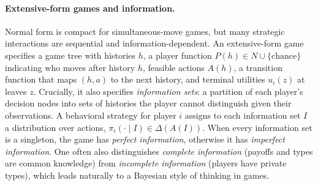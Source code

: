 \documentclass{article}
\begin{document}
\paragraph{Extensive-form games and information.}
Normal form is compact for simultaneous-move games, but many strategic interactions are sequential and information-dependent. An extensive-form game specifies a game tree with histories \(h\), a player function \(P(h)\in N\cup\{\text{chance}\}\) indicating who moves after history \(h\), feasible actions \(A(h)\), a transition function that maps \((h,a)\) to the next history, and terminal utilities \(u_i(z)\) at leaves \(z\). Crucially, it also specifies \emph{information sets}: a partition of each player’s decision nodes into sets of histories the player cannot distinguish given their observations. A behavioral strategy for player \(i\) assigns to each information set \(I\) a distribution over actions, \(\pi_i(\cdot \mid I)\in \Delta(A(I))\). When every information set is a singleton, the game has \emph{perfect information}, otherwise it has \emph{imperfect information}. One often also distinguishes \emph{complete information} (payoffs and types are common knowledge) from \emph{incomplete information} (players have private types), which leads naturally to a Bayesian style of thinking in games.

\end{document}
